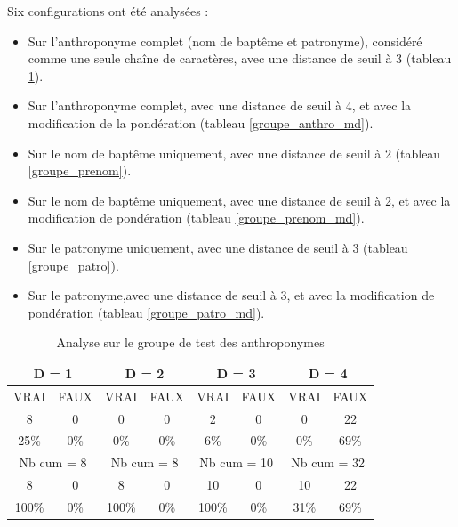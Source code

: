 Six configurations ont  été analysées :
\begin{itemize}
    \item Sur l'anthroponyme complet (nom de baptême et patronyme), considéré comme une seule chaîne de caractères, avec une distance de seuil à 3 (tableau \ref{groupe_anthro}).
    \item Sur l'anthroponyme complet, avec une distance de seuil à 4, et avec la modification de la pondération (tableau \ref{groupe_anthro_md}).
    \item Sur le nom de baptême uniquement, avec une distance de seuil à 2 (tableau \ref{groupe_prenom}).
    \item Sur le nom de baptême uniquement, avec une distance de seuil à 2, et avec la modification de pondération (tableau \ref{groupe_prenom_md}).
    \item Sur le patronyme uniquement, avec une distance de seuil à 3 (tableau \ref{groupe_patro}).
    \item Sur le patronyme,avec une distance de seuil à 3, et avec la modification de pondération (tableau \ref{groupe_patro_md}).
\end{itemize}
\vspace{0,5cm}



\renewcommand{\arraystretch} {1.25}
\begin{table}[ht]
    \centering
    \begin{tabular}{|c|c|c|c|c|c|c|c|}
        \hline \multicolumn{2}{|c}{D = 1}& \multicolumn{2}{|c}{D = 2} & \multicolumn{2}{|c}{D = 3} & \multicolumn{2}{|c|}{D = 4} \\
        \hline VRAI & FAUX & VRAI & FAUX & VRAI & FAUX & VRAI & FAUX \\
        \hline \hline  8 & 0 & 0 & 0 & 2 & 0 & 0 & 22 \\
        \hline 25\% & 0\% & 0\% & 0\% & 6\% & 0\% & 0\% & 69\%  \\
        \hline \hline \multicolumn{2}{|c}{Nb cum = 8 }& \multicolumn{2}{|c|}{Nb cum = 8 } & \multicolumn{2}{c|}{Nb cum = 10} & \multicolumn{2}{c|}{Nb cum = 32} \\
        \hline \hline  8 & 0 & 8 & 0 & 10 & 0 & 10 & 22 \\
        \hline 100\% & 0\% & 100\% & 0\% & 100\% & 0\% & 31\% & 69\%  \\
        \hline 
    \end{tabular}
    \caption{Analyse sur le groupe de test des anthroponymes }
    \label{groupe_anthro}
\end{table}

